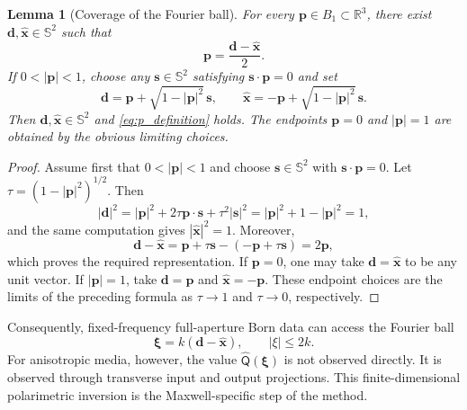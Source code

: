 \documentclass[11pt]{article}
\numberwithin{equation}{section}
\newcommand{\R}{\mathbb{R}}
\newcommand{\Sph}{\mathbb{S}}
\newcommand{\vect}[1]{\bm{#1}}
\newcommand{\tens}[1]{\bm{\mathsf{#1}}}
\newcommand{\Qt}{\ensuremath{\tens{Q}}}
\newcommand{\abs}[1]{\left\lvert #1\right\rvert}
\theoremstyle{plain}
\newtheorem{lemma}[theorem]{Lemma}
\theoremstyle{definition}
\begin{document}
\begin{lemma}[Coverage of the Fourier ball]\label{lem:coverage}
For every $\vect{p}\in B_1\subset\R^3$, there exist $\vect{d},\hat{\vect{x}}\in\Sph^2$ such that
\begin{equation}\label{eq:p_definition}
  \vect{p}=\frac{\vect{d}-\hat{\vect{x}}}{2}.
\end{equation}
If $0<\abs{\vect{p}}<1$, choose any $\vect{s}\in\Sph^2$ satisfying $\vect{s}\cdot \vect{p}=0$ and set
\begin{equation*}
  \vect{d}=\vect{p}+\sqrt{1-\abs{\vect{p}}^2}\,\vect{s},
  \qquad
  \hat{\vect{x}}=-\vect{p}+\sqrt{1-\abs{\vect{p}}^2}\,\vect{s} .
\end{equation*}
Then $\vect{d},\hat{\vect{x}}\in\Sph^2$ and \eqref{eq:p_definition} holds.  The endpoints $\vect{p}=0$ and $\abs{\vect{p}}=1$ are obtained by the obvious limiting choices.
\end{lemma}

\begin{proof}
Assume first that \(0<\abs{\vect{p}}<1\) and choose \(\vect{s}\in\Sph^2\) with \(\vect{s}\cdot\vect{p}=0\).  Let \(\tau=(1-\abs{\vect{p}}^2)^{1/2}\).  Then
\[
  \abs{\vect{d}}^2
  =\abs{\vect{p}}^2+2\tau\vect{p}\cdot\vect{s}+\tau^2\abs{\vect{s}}^2
  =\abs{\vect{p}}^2+1-\abs{\vect{p}}^2=1,
\]
and the same computation gives \(\abs{\hat{\vect{x}}}^2=1\).  Moreover,
\[
  \vect{d}-\hat{\vect{x}}
  =\vect{p}+\tau\vect{s}-(-\vect{p}+\tau\vect{s})=2\vect{p},
\]
which proves the required representation.  If \(\vect{p}=0\), one may take \(\vect{d}=\hat{\vect{x}}\) to be any unit vector.  If \(\abs{\vect{p}}=1\), take \(\vect{d}=\vect{p}\) and \(\hat{\vect{x}}=-\vect{p}\).  These endpoint choices are the limits of the preceding formula as \(\tau\to1\) and \(\tau\to0\), respectively.
\end{proof}

Consequently, fixed-frequency full-aperture Born data can access the Fourier ball
\begin{equation*}
  \vect{\xi}=k(\vect{d}-\hat{\vect{x}}), \qquad \abs{\xi}\le 2k .
\end{equation*}
For anisotropic media, however, the value $\widehat{\Qt}(\vect{\xi})$ is not observed directly.  It is observed through transverse input and output projections.  This finite-dimensional polarimetric inversion is the Maxwell-specific step of the method.
\end{document}

